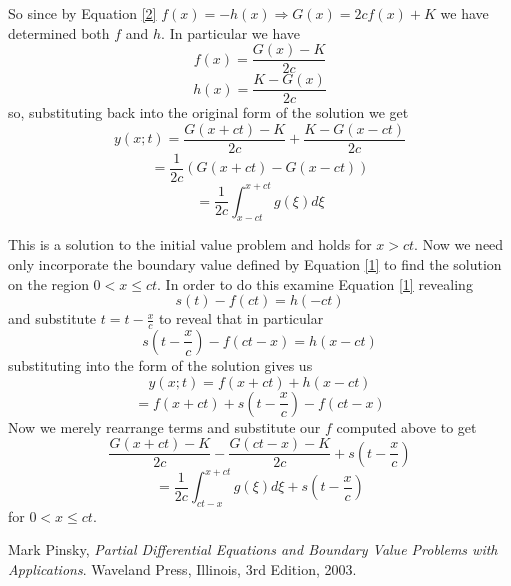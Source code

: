 \documentclass[12pt]{article}
\begin{document}
So since by Equation \ref{2} $f(x)=-h(x) \Rightarrow G(x)  =2 c  f(x) +K $ we have determined both $f$ and $h$. In particular we have
\[f(x)=\frac{G(x)-K}{2 c}\]
\[h(x)=\frac{K-G(x)}{2 c}\]
so, substituting back into the original form of the solution we get
\[y(x;t)=\frac{G(x+ct)-K}{2 c}+\frac{K-G(x-ct)}{2 c}\]
\[=\frac{1}{2c} \left(G(x+ct)-G(x-ct)\right)\]
\[=\frac{1}{2c} \int_{x-ct}^{x+ct} g(\xi) d\xi \]

This is a solution to the initial value problem and holds for $x>ct$. Now we need only incorporate the boundary value defined by Equation \ref{1} to find the solution on the region $0<x \leq ct$. In order to do this examine Equation \ref{1} revealing
\[s(t)-f(ct)=h(-ct)\]
and substitute $t=t-\frac{x}{c}$ to reveal that in particular
\[s(t-\frac{x}{c})-f(ct-x)=h(x-ct)\]
substituting into the form of the solution gives us
\[y(x;t)=f(x+ct)+h(x-ct)\]
\[=f(x+ct)+s(t-\frac{x}{c})-f(ct-x)\]
Now we merely rearrange terms and substitute our $f$ computed above to get
\[\frac{G(x+ct)-K}{2 c}-\frac{G(ct-x)-K}{2 c}+s(t-\frac{x}{c})\]
\[=\frac{1}{2 c}\int_{ct-x}^{x+ct} g(\xi) d\xi+s(t-\frac{x}{c})\]
for $0<x \leq ct$.


\begin{thebibliography}{9}

	  Mark Pinsky,
	  \emph{Partial Differential Equations and Boundary Value Problems with Applications}.
	  Waveland Press, Illinois,
	  3rd Edition,
	  2003.

\end{thebibliography}
\end{document}
